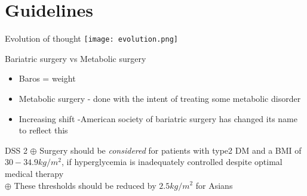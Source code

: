 \documentclass[11pt]{beamer}
\begin{document}
\section{Guidelines}
\begin{frame}{Evolution of thought  }
\texttt{[image: evolution.png]}
\end{frame} 
\begin{frame}{Bariatric surgery vs Metabolic surgery  }
\begin{itemize}

\item Baros = weight
\item Metabolic surgery - done with the intent of treating some metabolic disorder
\item Increasing shift -American society of bariatric surgery has changed its name to reflect this
	
\end{itemize}
\end{frame} 
\begin{frame}{DSS 2  }
$ \oplus $ Surgery should be \emph{considered} for patients with type2 DM and a BMI of \emph{$  30 - 34.9 kg/m^{2}$}, if hyperglycemia is inadequately controlled despite optimal medical therapy \\ [1 ex]
$ \oplus $ These thresholds should be reduced by $ 2.5 kg/m^{2} $ for Asians 
\end{frame} 
\end{document}
